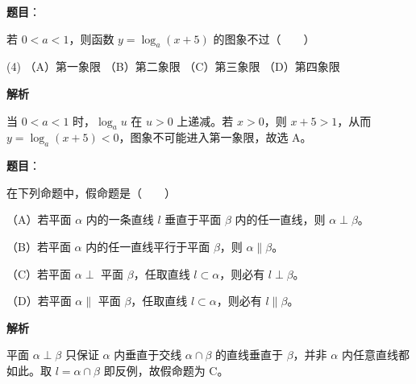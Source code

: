 \begin{answer}

\textbf{题目}：

若 $0<a<1$，则函数 $y=\log_a(x+5)$ 的图象不过\mbox{（　　）}

\begin{gkopts}(4)
\task （A）第一象限
\task （B）第二象限
\task （C）第三象限
\task （D）第四象限
\end{gkopts}

\textbf{解析}

当 $0<a<1$ 时，$\log_a u$ 在 $u>0$ 上递减。若 $x>0$，则 $x+5>1$，从而 $y=\log_a(x+5)<0$，图象不可能进入第一象限，故选 A。


\end{answer}
\begin{answer}

\textbf{题目}：

在下列命题中，假命题是\mbox{（　　）}

（A）若平面 $\alpha$ 内的一条直线 $l$ 垂直于平面 $\beta$ 内的任一直线，则 $\alpha\perp\beta$。

（B）若平面 $\alpha$ 内的任一直线平行于平面 $\beta$，则 $\alpha\parallel\beta$。

（C）若平面 $\alpha\perp$ 平面 $\beta$，任取直线 $l\subset\alpha$，则必有 $l\perp\beta$。

（D）若平面 $\alpha\parallel$ 平面 $\beta$，任取直线 $l\subset\alpha$，则必有 $l\parallel\beta$。

\textbf{解析}

平面 $\alpha\perp\beta$ 只保证 $\alpha$ 内垂直于交线 $\alpha\cap\beta$ 的直线垂直于 $\beta$，并非 $\alpha$ 内任意直线都如此。取 $l=\alpha\cap\beta$ 即反例，故假命题为 C。


\end{answer}
